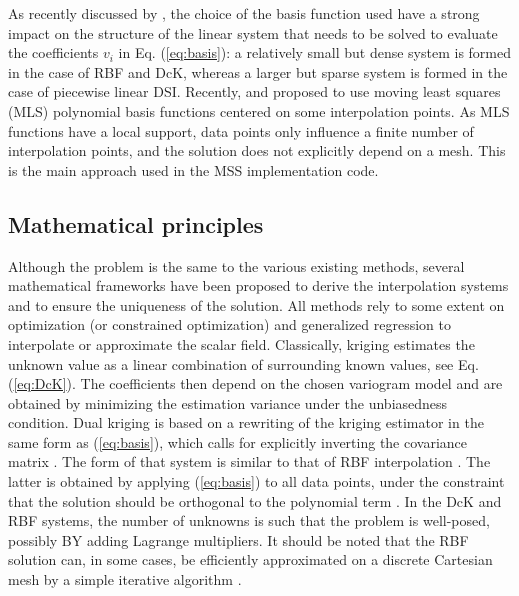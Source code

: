 \documentclass[final]{ring20}
\begin{document}
{As recently discussed by \citet{Renaudeau2019MG}, the choice of the basis function used have a strong impact on the structure of the linear system that needs to be solved to evaluate the coefficients $v_i$ in Eq. (\ref{eq:basis}): a relatively small but dense system is formed in the case of RBF and DcK, whereas a larger but sparse system is formed in the case of piecewise linear DSI. Recently, \citet{Renaudeau2019MG} and \citet{Manchuk2019CG} proposed to use moving least squares (MLS) polynomial basis functions centered on some interpolation points. As MLS functions have a local support, data points only influence a finite number of interpolation points, and the solution does not explicitly depend on a mesh. This is the main approach used in the MSS implementation code. 

\subsection{Mathematical principles} 

Although the problem is the same to the various existing methods, several mathematical frameworks have been proposed to derive the interpolation systems and to ensure the uniqueness of the solution. 
All methods rely to some extent on optimization (or constrained optimization) and generalized regression to interpolate or approximate the scalar field. Classically, kriging estimates the unknown value as a linear combination of surrounding known values, see Eq. (\ref{eq:DcK}). The coefficients then depend on the chosen variogram model and are obtained by minimizing the estimation variance under the unbiasedness condition. Dual kriging is based on a rewriting of the kriging estimator in the same form as (\ref{eq:basis}), which calls for explicitly inverting the covariance matrix \citep{Lajaunie1997MG,Chiles04OMSMP}. The form of that system is similar to that of RBF interpolation \citep{Dubrule1984CG,Hillier2014MG}. The latter is obtained by applying (\ref{eq:basis}) to all data points, under the constraint that the solution should be orthogonal to the polynomial term \citep{Carr2001,Hillier2014MG}. In the DcK and RBF systems, the number of unknowns is such that the problem is well-posed, possibly BY adding Lagrange multipliers. It should be noted that the RBF solution can, in some cases, be efficiently approximated on a discrete Cartesian mesh by a simple iterative algorithm \citep{Park2006ITVCG}. 

}
\end{document}
